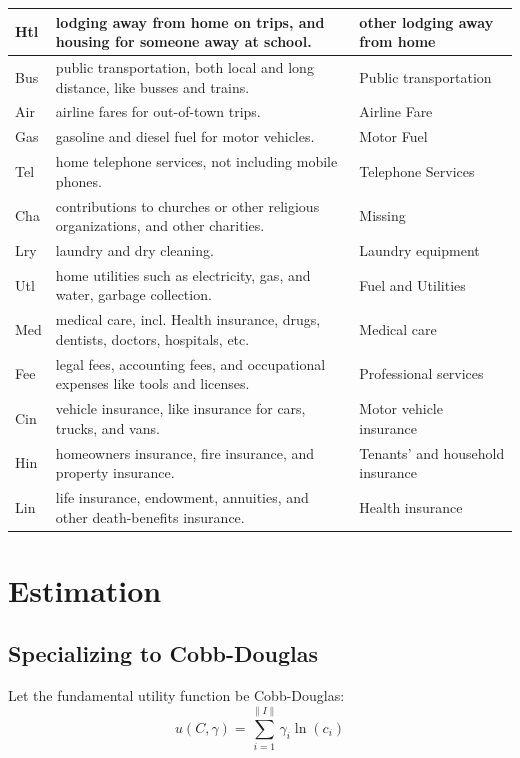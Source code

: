 \documentclass{article}
\begin{document}
\begin{sideways}
\begin{tabular}{|l|l|l|}
\hline
Htl & lodging away from home on trips, and housing for someone away at school. & other lodging away from home\\ 
\hline
Bus & public transportation, both local and long distance, like busses and trains. & Public transportation\\ 
\hline
Air & airline fares for out-of-town trips. & Airline Fare\\ 
\hline
Gas & gasoline and diesel fuel for motor vehicles. & Motor Fuel\\ 
\hline
Tel & home telephone services, not including mobile phones. & Telephone Services\\ 
\hline
Cha & contributions to churches or other religious organizations, and other charities. & Missing\\ 
\hline
Lry & laundry and dry cleaning. & Laundry equipment\\ 
\hline
Utl & home utilities such as electricity, gas, and water, garbage collection. & Fuel and Utilities\\ 
\hline
Med & medical care, incl. Health insurance, drugs, dentists, doctors, hospitals, etc. & Medical care\\ 
\hline
Fee & legal fees, accounting fees, and occupational expenses like tools and licenses. & Professional services\\ 
\hline
Cin & vehicle insurance, like insurance for cars, trucks, and vans. & Motor vehicle insurance\\ 
\hline
Hin & homeowners insurance, fire insurance, and property insurance. & Tenants' and household insurance\\ 
\hline
Lin & life insurance, endowment, annuities, and other death-benefits insurance. & Health insurance\\ 
\hline
\end{tabular}
\end{sideways}

\section{Estimation}
\subsection{Specializing to Cobb-Douglas}
Let the fundamental utility function be Cobb-Douglas:
\[u(C,\gamma) = \sum_{i=1}^{\|I\|} \gamma_i \ln(c_i)\]
\end{document}
